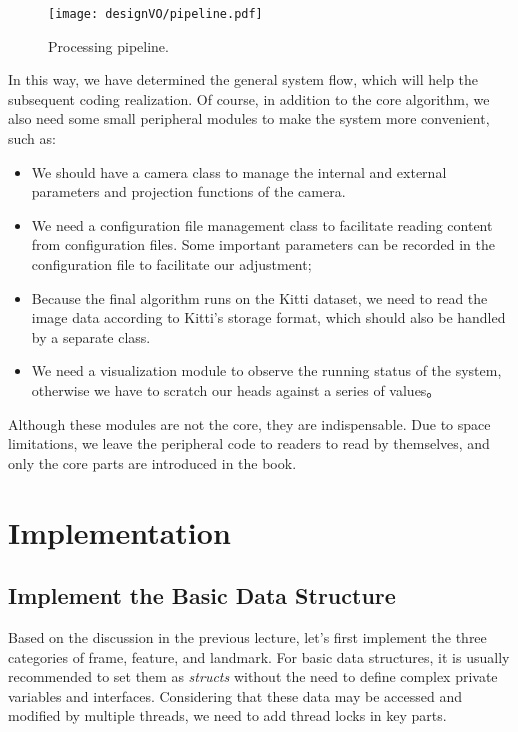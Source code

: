 \begin{figure}[!htp]
	\centering
	\texttt{[image: designVO/pipeline.pdf]}
	\caption{Processing pipeline.}
	\label{fig:pipeline}
\end{figure}

In this way, we have determined the general system flow, which will help the subsequent coding realization. Of course, in addition to the core algorithm, we also need some small peripheral modules to make the system more convenient, such as:
\begin{itemize}
	\item We should have a camera class to manage the internal and external parameters and projection functions of the camera.
	\item We need a configuration file management class to facilitate reading content from configuration files. Some important parameters can be recorded in the configuration file to facilitate our adjustment;
	\item Because the final algorithm runs on the Kitti dataset, we need to read the image data according to Kitti's storage format, which should also be handled by a separate class.
	\item We need a visualization module to observe the running status of the system, otherwise we have to scratch our heads against a series of values。
\end{itemize}

Although these modules are not the core, they are indispensable. Due to space limitations, we leave the peripheral code to readers to read by themselves, and only the core parts are introduced in the book.

\section{Implementation}
\subsection{Implement the Basic Data Structure}
Based on the discussion in the previous lecture, let's first implement the three categories of frame, feature, and landmark. For basic data structures, it is usually recommended to set them as \textit{structs} without the need to define complex private variables and interfaces. Considering that these data may be accessed and modified by multiple threads, we need to add thread locks in key parts.

